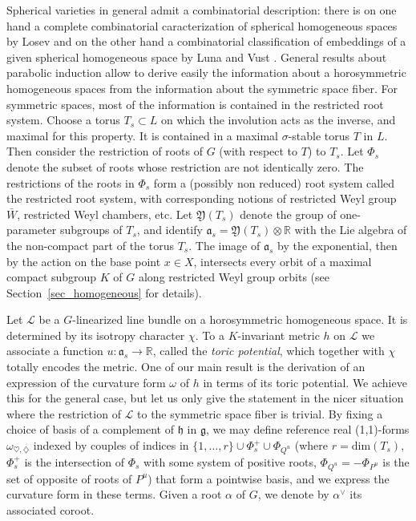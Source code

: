 \documentclass{amsart}
\theoremstyle{definition}
\begin{document}
Spherical varieties in general admit a combinatorial description: there is on 
one hand a complete combinatorial caracterization of spherical homogeneous spaces by Losev \cite{Los09}
and on the other hand a combinatorial classification of embeddings of 
a given spherical homogeneous space by Luna and Vust \cite{LV83,Kno91}. 
General results about parabolic induction allow to derive easily the 
information about a horosymmetric homogeneous spaces from the information 
about the symmetric space fiber. For symmetric spaces, most of the information 
is contained in the restricted root system. Choose a torus $T_s\subset L$ on 
which the involution acts as the inverse, and maximal for this property. It 
is contained in a maximal $\sigma$-stable torus $T$ in $L$.  
Then consider the restriction of 
roots of $G$ (with respect to $T$) to $T_s$. Let $\Phi_s$ denote the subset 
of roots whose restriction are not identically zero. 
The restrictions of the roots in $\Phi_s$ form a (possibly non reduced) root system called 
the restricted root system, 
with corresponding notions of restricted Weyl group $\bar{W}$, restricted Weyl chambers, etc.
Let $\mathfrak{Y}(T_s)$ denote the group of one-parameter subgroups of $T_s$, and 
identify $\mathfrak{a}_s=\mathfrak{Y}(T_s)\otimes \mathbb{R}$ with the Lie algebra of the 
non-compact part of the torus $T_s$.
The image of $\mathfrak{a}_s$ by the exponential, then by the action 
on the base point $x\in X$, intersects every orbit of a maximal compact subgroup 
$K$ of $G$ along restricted Weyl group orbits (see Section~\ref{sec_homogeneous} for details). 

Let $\mathcal{L}$ be a $G$-linearized line bundle on a horosymmetric homogeneous space. 
It is determined by its isotropy character $\chi$.  
To a $K$-invariant metric $h$ on $\mathcal{L}$ we associate a function 
$u:\mathfrak{a}_s\rightarrow \mathbb{R}$, called the 
\emph{toric potential}, which together with $\chi$ totally encodes the metric. 
One of our main result is the derivation of an expression of the curvature form 
$\omega$ of $h$ in terms of its toric potential. 
We achieve this for the general case, but let us only give the statement in the 
nicer situation where the restriction of $\mathcal{L}$ to the symmetric space 
fiber is trivial. 
By fixing a choice of basis of a complement of $\mathfrak{h}$ in $\mathfrak{g}$, 
we may define reference real (1,1)-forms $\omega_{\heartsuit,\diamondsuit}$ indexed by 
couples of indices in $\{1,\ldots,r\}\cup\Phi_s^+\cup\Phi_{Q^u}$ (where $r=\mathrm{dim}(T_s)$, $\Phi_s^+$ is 
the intersection of $\Phi_s$ with some system of positive roots, $\Phi_{Q^u}=-\Phi_{P^u}$
is the set of opposite of roots of $P^u$) that form a pointwise basis, 
and we express the curvature form in these terms. Given a root $\alpha$ of $G$, 
we denote by $\alpha^{\vee}$ its associated coroot. 
\end{document}
